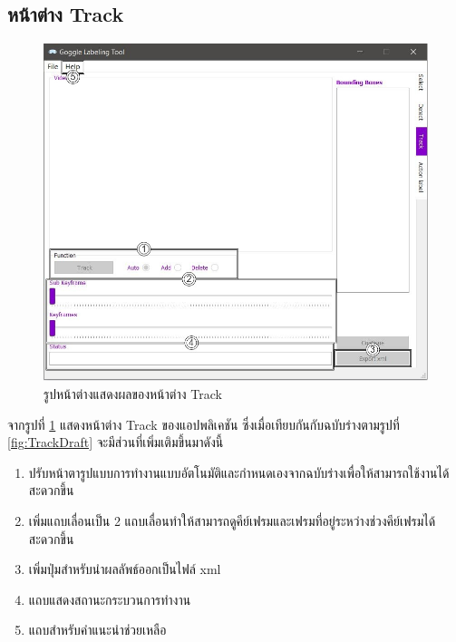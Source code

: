 \subsection*{หน้าต่าง Track}
\begin{figure}[!ht]
  \centering
    \includegraphics[scale=0.4]{chapter4/images/Final_ui/Track.jpg}
    \caption{รูปหน้าต่างแสดงผลของหน้าต่าง Track}
    \label{fig:final_track}
\end{figure}
จากรูปที่ \ref{fig:final_track} แสดงหน้าต่าง Track ของแอปพลิเคชัน ซึ่งเมื่อเทียบกันกับฉบับร่างตามรูปที่ \ref{fig:TrackDraft} จะมีส่วนที่เพิ่มเติมขึ้นมาดังนี้
\begin{enumerate}
	\item ปรับหน้าตารูปแบบการทำงานแบบอัตโนมัติและกำหนดเองจากฉบับร่างเพื่อให้สามารถใช้งานได้สะดวกขึ้น
	\item เพิ่มแถบเลื่อนเป็น 2 แถบเลื่อนทำให้สามารถดูคีย์เฟรมและเฟรมที่อยู่ระหว่างช่วงคีย์เฟรมได้สะดวกขึ้น
	\item เพิ่มปุ่มสำหรับนำผลลัพธ์ออกเป็นไฟล์ xml 
	\item แถบแสดงสถานะกระบวนการทำงาน
	\item แถบสำหรับคำแนะนำช่วยเหลือ
\end{enumerate}		

\clearpage
